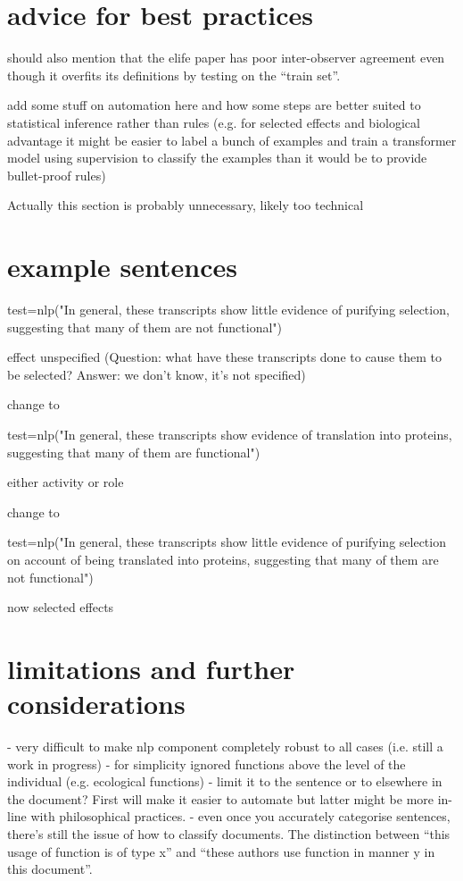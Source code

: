 \documentclass{article}
\begin{document}
\section{advice for best practices}
\label{sec:advice-best-pract}

should also mention that the elife paper has poor inter-observer agreement even though it overfits its definitions by testing on the ``train set''.

add some stuff on automation here and how some steps are better suited to statistical inference rather than rules (e.g. for selected effects and biological advantage it might be easier to label a bunch of examples and train a transformer model using supervision to classify the examples than it would be to provide bullet-proof rules)

Actually this section is probably unnecessary, likely too technical

\section{example sentences}
\label{sec:example-sentences}

test=nlp("In general, these transcripts show little evidence of purifying selection, suggesting that many of them are not functional")

effect unspecified (Question: what have these transcripts done to cause them to be selected? Answer: we don't know, it's not specified)

change to

test=nlp("In general, these transcripts show evidence of translation into proteins, suggesting that many of them are functional")

either activity or role

change to

test=nlp("In general, these transcripts show little evidence of purifying selection on account of being translated into proteins, suggesting that many of them are not functional")

now selected effects

\section{limitations and further considerations}
\label{sec:limitations}

- very difficult to make nlp component completely robust to all cases (i.e. still a work in progress)
- for simplicity ignored functions above the level of the individual (e.g. ecological functions)
- limit it to the sentence or to elsewhere in the document? First will make it easier to automate but latter might be more in-line with philosophical practices.
- even once you accurately categorise sentences, there's still the issue of how to classify documents. The distinction between ``this usage of function is of type x'' and ``these authors use function in manner y in this document''.
\end{document}
